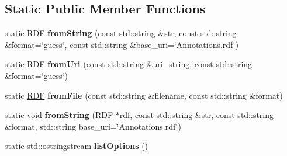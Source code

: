 \subsection*{Static Public Member Functions}
\begin{DoxyCompactItemize}
\item 
\mbox{\label{classomexmeta_1_1RDF_ac446d196004562580ed211552f12f161}} 
static \hyperlink{classomexmeta_1_1RDF}{R\+DF} {\bfseries from\+String} (const std\+::string \&str, const std\+::string \&format=\char`\"{}guess\char`\"{}, const std\+::string \&base\+\_\+uri=\char`\"{}Annotations.\+rdf\char`\"{})
\item 
\mbox{\label{classomexmeta_1_1RDF_a03906aa5c3b9429a2afdbe0ad2be21e6}} 
static \hyperlink{classomexmeta_1_1RDF}{R\+DF} {\bfseries from\+Uri} (const std\+::string \&uri\+\_\+string, const std\+::string \&format=\char`\"{}guess\char`\"{})
\item 
\mbox{\label{classomexmeta_1_1RDF_a98a1da84161a7935bf38ec5e5d34e91f}} 
static \hyperlink{classomexmeta_1_1RDF}{R\+DF} {\bfseries from\+File} (const std\+::string \&filename, const std\+::string \&format)
\item 
\mbox{\label{classomexmeta_1_1RDF_ab2dadc7ff1cf25edbb401b2c879a21b0}} 
static void {\bfseries from\+String} (\hyperlink{classomexmeta_1_1RDF}{R\+DF} $\ast$rdf, const std\+::string \&str, const std\+::string \&format, std\+::string base\+\_\+uri=\char`\"{}Annotations.\+rdf\char`\"{})
\item 
\mbox{\label{classomexmeta_1_1RDF_ae01ed260e02eda2141ffe1288f78c177}} 
static std\+::ostringstream {\bfseries list\+Options} ()
\end{DoxyCompactItemize}
